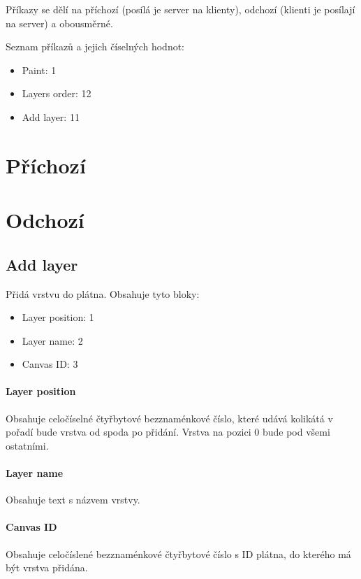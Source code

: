 \documentclass[12pt,oneside,a4paper]{report}
\begin{document}
Příkazy se dělí na příchozí (posílá je server na klienty), odchozí (klienti je posílají na server) a obousměrné.

Seznam příkazů a jejich číselných hodnot:

\begin{itemize}
	\item Paint: 1
	\item Layers order: 12
	\item Add layer: 11
\end{itemize}

\section{Příchozí}

\section{Odchozí}

\subsection{Add layer}

Přidá vrstvu do plátna. Obsahuje tyto bloky:

\begin{itemize}
	\item Layer position: 1
	\item Layer name: 2
	\item Canvas ID: 3
\end{itemize}

\paragraph{Layer position}
Obsahuje celočíselné čtyřbytové bezznaménkové číslo, které udává kolikátá v pořadí bude vrstva od spoda po přidání. Vrstva na pozici $0$ bude pod všemi ostatními.

\paragraph{Layer name}
Obsahuje text s názvem vrstvy.

\paragraph{Canvas ID}
Obsahuje celočíslené bezznaménkové čtyřbytové číslo s ID plátna, do kterého má být vrstva přidána.
\end{document}
